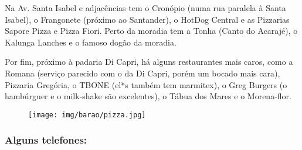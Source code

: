 Na Av. Santa Isabel e adjacências tem o Cronópio (numa rua paralela à Santa
Isabel), o Frangonete (próximo ao Santander), o HotDog Central e as Pizzarias
Sapore Pizza e Pizza Fiori. Perto da moradia tem a Tonha (Canto do Acarajé), o
Kalunga Lanches e o famoso dogão da moradia.

Por fim, próximo à padaria Di Capri, há alguns restaurantes mais caros, como a
Romana (serviço parecido com o da Di Capri, porém um bocado mais cara),
Pizzaria Gregória, o TBONE (el*s também tem marmitex), o Greg Burgers (o
hambúrguer e o milk-shake são excelentes), o Tábua dos Mares e o Morena-flor.

\begin{figure}[h!]
    \centering
    \texttt{[image: img/barao/pizza.jpg]}
\end{figure}

\subsubsection{Alguns telefones:}

